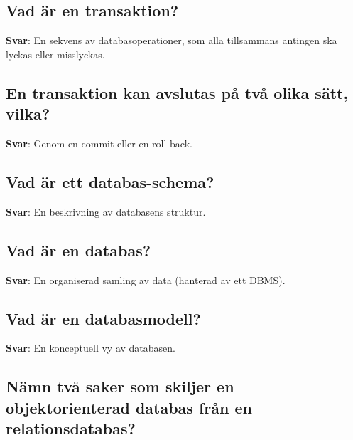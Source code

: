 \documentclass[a4paper,11pt,oneside]{article}
\begin{document}
\begin{sloppypar}
\subsection{Vad \"ar en transaktion?}

\label{q:286:sa:sv:True}

\textbf{Svar}: En sekvens av databasoperationer, som alla tillsammans antingen ska lyckas eller misslyckas.



\subsection{En transaktion kan avslutas p\r{a} tv\r{a} olika s\"att, vilka?}

\label{q:287:sa:sv:True}

\textbf{Svar}: Genom en commit eller en roll-back.



\subsection{Vad \"ar ett databas-schema?}

\label{q:288:sa:sv:True}

\textbf{Svar}: En beskrivning av databasens struktur.



\subsection{Vad \"ar en databas?}

\label{q:289:sa:sv:True}

\textbf{Svar}: En organiserad samling av data (hanterad av ett DBMS).



\subsection{Vad \"ar en databasmodell?}

\label{q:290:sa:sv:True}

\textbf{Svar}: En konceptuell vy av databasen.



\subsection{N\"amn tv\r{a} saker som skiljer en objektorienterad databas fr\r{a}n en relationsdatabas?}


\end{sloppypar}
\end{document}
